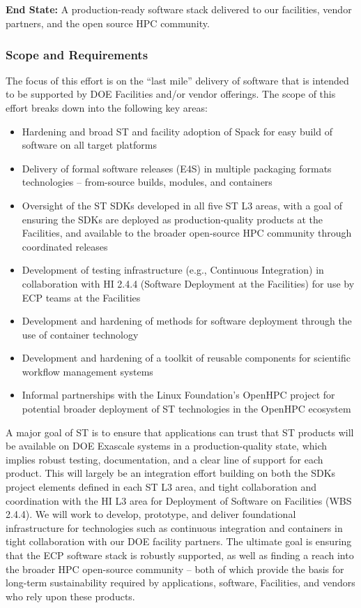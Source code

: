 \subsection{ \ecosystem}\label{subsect:ecosystem}

\textbf{End State:} A production-ready software stack delivered to our facilities, vendor partners, and the open source HPC community.

\subsubsection{Scope and Requirements}
The focus of this effort is on the ``last mile'' delivery of software that is intended to be supported by DOE Facilities and/or vendor offerings. The scope of this effort breaks down into the following key areas:
\begin{itemize}
	\item Hardening and broad ST and facility adoption of Spack for easy build of software on all target platforms
        \item Delivery of formal software releases (E4S) in multiple packaging formats technologies -- from-source builds, modules, and containers
	\item Oversight of the ST SDKs developed in all five ST L3 areas, with a goal of ensuring the SDKs are deployed as production-quality products at the Facilities, and available to the broader open-source HPC community through coordinated releases
	\item Development of testing infrastructure (e.g., Continuous Integration) in collaboration with HI 2.4.4 (Software Deployment at the Facilities) for use by ECP teams at the Facilities
	\item Development and hardening of methods for software deployment through the use of container technology
	\item Development and hardening of a toolkit of reusable components for scientific workflow management systems
	\item Informal partnerships with the Linux Foundation's OpenHPC project for potential broader deployment of ST technologies in the OpenHPC ecosystem
\end{itemize}

A major goal of ST is to ensure that applications can trust that ST products will be available on DOE Exascale systems in a production-quality state, which implies robust testing, documentation, and a clear line of support for each product. This will largely be an integration effort building on both the SDKs project elements defined in each ST L3 area, and tight collaboration and coordination with the HI L3 area for Deployment of Software on Facilities (WBS 2.4.4). We will work to develop, prototype, and deliver foundational infrastructure for technologies such as continuous integration and containers in tight collaboration with our DOE facility partners. The ultimate goal is ensuring that the ECP software stack is robustly supported, as well as finding a reach into the broader HPC open-source community -- both of which provide the basis for long-term sustainability required by applications, software, Facilities, and vendors who rely upon these products.

